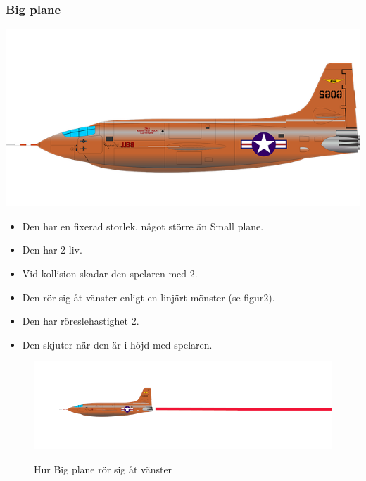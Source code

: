 \documentclass{TDP005mall}
\begin{document}
\subsubsection*{Big plane}
\includegraphics[scale=0.2]{Images/Enemy2.png}
\begin{itemize}
\item Den har en fixerad storlek, något större än Small plane.
\item Den har 2 liv.
\item Vid kollision skadar den spelaren med 2.
\item Den rör sig åt vänster enligt en linjärt mönster (se figur2).
\item Den har röreslehastighet 2.
\item Den skjuter när den är i höjd med spelaren.
\end{itemize}
\begin{figure}[h!]
  \centering
  \includegraphics[scale=0.4]{Images/Enemy2-movement.png}
  \label{Bild 2}
  \caption{Hur Big plane rör sig åt vänster}
\end{figure}

\newpage
\end{document}
